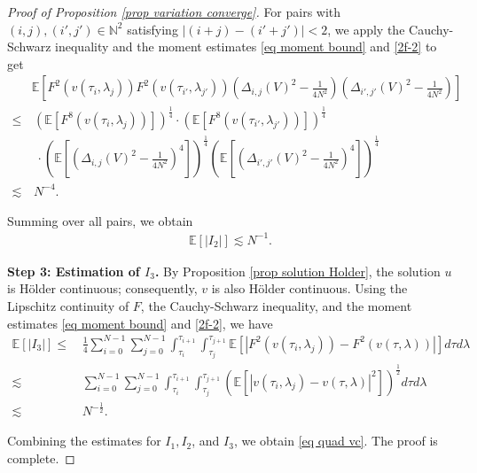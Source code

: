\documentclass[11pt,reqno]{amsart}
\numberwithin{equation}{section}
\newcommand{\1}{{\bf 1}}
\newcommand{\2}{{\bf 2}}
\begin{document}
\begin{proof}[Proof of Proposition \ref{prop variation converge}]
For pairs with   $(i, j), (i', j')\in \mathbb N^2$   satisfying $|(i+j)-( i'+j')|<2$,  we apply   the  Cauchy-Schwarz  inequality and the moment estimates   \eqref{eq moment bound} and \eqref{2f-2}  to get
           \begin{align*}
  & \mathbb E\left[   F^2(v(\tau_i, \lambda_j) )  F^2(v(\tau_{i'}, \lambda_{j'})) \left(   \Delta_{i,j}(V)^2   -\frac{1}{4N^2}\right)   \left(    \Delta_{i',j'}(V)^2   -\frac{1}{4N^2}\right) \right]\\
  \le &\, \left(\mathbb E\left[   F^8(v(\tau_i, \lambda_j) )  \right]\right)^{\frac14}  \cdot \left(\mathbb E\left[  F^8(v(\tau_{i'}, \lambda_{j'})) \right] \right)^{\frac14}\\
  &\, \,  \cdot  \left(\mathbb E\left[  \left(   \Delta_{i,j}(V)^2   -\frac{1}{4N^2}\right)^4\right]\right)^{\frac14}  \left(\mathbb E\left[  \left(   \Delta_{i',j'}(V)^2   -\frac{1}{4N^2}\right)^4\right]\right)^{\frac14}    \\
 \lesssim &\,   N^{-4}.
     \end{align*}
        
Summing over all   pairs, we obtain
 \begin{align*}
\mathbb E [|I_2|]\lesssim   N^{-1}.
  \end{align*}   

  
  \noindent\textbf{Step 3:  Estimation of  $I_3$.} 
 By Proposition \ref{prop solution Holder},  the solution   $u$ is   H\"older continuous; consequently,     $v$ is also    H\"older continuous.
      Using the Lipschitz continuity of $F$, the Cauchy-Schwarz inequality,   and the moment estimates \eqref{eq moment bound} and \eqref{2f-2}, we  have
        \begin{align*}
  \mathbb E[|I_3|] \le &  \, \frac{1}{4} \sum_{i=0}^{N-1}\sum_{j=0}^{N-1} \int_{\tau_i}^{\tau_{i+1}}  \int_{\tau_j}^{\tau_{j+1}}    \mathbb E  \left[| F^2(v(\tau_i, \lambda_j)) - F^2(v(\tau, \lambda))|  \right]  d\tau d\lambda\\
   \lesssim  &  \,    \sum_{i=0}^{N-1}\sum_{j=0}^{N-1} \int_{\tau_i}^{\tau_{i+1}}  \int_{\tau_j}^{\tau_{j+1}}  \left(  \mathbb E  \left[|  v(\tau_i, \lambda_j) -v(\tau, \lambda)| ^2 \right] \right)^{\frac12} d\tau d\lambda\\
 \lesssim  &\,      N^{-\frac12}.
    \end{align*}  
    
    Combining the estimates for $I_1, I_2$, and  $I_3$, we obtain  \eqref{eq quad vc}.
         The proof is complete.  	      
 \end{proof}
  
\end{document}
